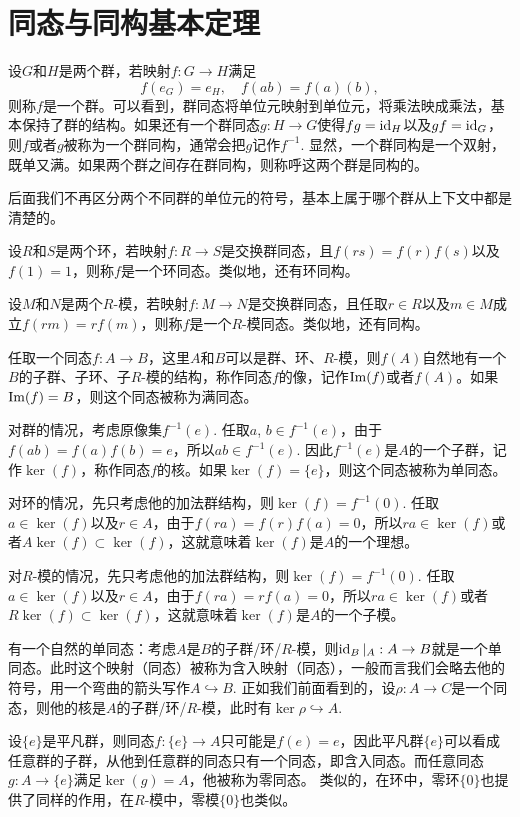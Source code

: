 \section{同态与同构基本定理}

\para 设$G$和$H$是两个群，若映射$f:G\to H$满足
\[
	f(e_G)=e_H,\quad f(ab)=f(a)(b),
\]
则称$f$是一个群。可以看到，群同态将单位元映射到单位元，将乘法映成乘法，基本保持了群的结构。如果还有一个群同态$g:H\to G$使得$fg=\operatorname{id}_H$以及$gf=\operatorname{id}_G$，则$f$或者$g$被称为一个群同构，通常会把$g$记作$f^{-1}$. 显然，一个群同构是一个双射，既单又满。如果两个群之间存在群同构，则称呼这两个群是同构的。

后面我们不再区分两个不同群的单位元的符号，基本上属于哪个群从上下文中都是清楚的。

\para 设$R$和$S$是两个环，若映射$f:R\to S$是交换群同态，且$f(rs)=f(r)f(s)$以及$f(1)=1$，则称$f$是一个环同态。类似地，还有环同构。

设$M$和$N$是两个$R$-模，若映射$f:M\to N$是交换群同态，且任取$r\in R$以及$m\in M$成立$f(rm)=rf(m)$，则称$f$是一个$R$-模同态。类似地，还有同构。

\para 任取一个同态$f:A\to B$，这里$A$和$B$可以是群、环、$R$-模，则$f(A)$自然地有一个$B$的子群、子环、子$R$-模的结构，称作同态$f$的像，记作$\operatorname{Im}(f)$或者$f(A)$。如果$\operatorname{Im}(f)=B$，则这个同态被称为满同态。

对群的情况，考虑原像集$f^{-1}(e)$. 任取$a$, $b\in f^{-1}(e)$，由于$f(ab)=f(a)f(b)=e$，所以$ab\in f^{-1}(e)$. 因此$f^{-1}(e)$是$A$的一个子群，记作$\ker(f)$，称作同态$f$的核。如果$\ker(f)=\{e\}$，则这个同态被称为单同态。

对环的情况，先只考虑他的加法群结构，则$\ker(f)=f^{-1}(0)$. 任取$a\in \ker(f)$以及$r\in A$，由于$f(ra)=f(r)f(a)=0$，所以$ra\in \ker(f)$或者$A\ker(f)\subset \ker(f)$，这就意味着$\ker(f)$是$A$的一个理想。

对$R$-模的情况，先只考虑他的加法群结构，则$\ker(f)=f^{-1}(0)$. 任取$a\in \ker(f)$以及$r\in A$，由于$f(ra)=rf(a)=0$，所以$ra\in \ker(f)$或者$R\ker(f)\subset \ker(f)$，这就意味着$\ker(f)$是$A$的一个子模。

\para 有一个自然的单同态：考虑$A$是$B$的子群/环/$R$-模，则$\operatorname{id}_B|_A:A\to B$就是一个单同态。此时这个映射（同态）被称为含入映射（同态），一般而言我们会略去他的符号，用一个弯曲的箭头写作$A\hookrightarrow B$. 正如我们前面看到的，设$\rho:A\to C$是一个同态，则他的核是$A$的子群/环/$R$-模，此时有$\ker\rho\hookrightarrow A$.

设$\{e\}$是平凡群，则同态$f:\{e\}\to A$只可能是$f(e)=e$，因此平凡群$\{e\}$可以看成任意群的子群，从他到任意群的同态只有一个同态，即含入同态。而任意同态$g:A\to \{e\}$满足$\ker(g)=A$，他被称为零同态。 类似的，在环中，零环$\{0\}$也提供了同样的作用，在$R$-模中，零模$\{0\}$也类似。

